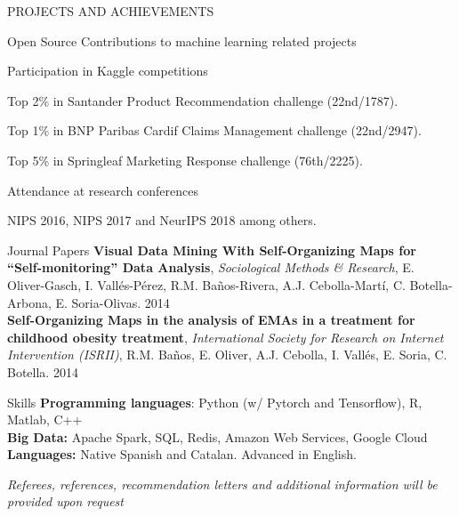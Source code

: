 \documentclass{resume} %
\begin{document}
\begin{rSection}{PROJECTS AND ACHIEVEMENTS}
\begin{rSubsection}{Open Source Contributions to machine learning related projects}
\end{rSubsection}

\vspace{-6pt}

\begin{rSubsection}{Participation in Kaggle competitions}
{}{}{}  

\vspace{-3pt}

\item Top 2\% in Santander Product Recommendation challenge (22nd/1787).
\item Top 1\% in BNP Paribas Cardif Claims Management challenge (22nd/2947).
\item Top 5\% in Springleaf Marketing Response challenge (76th/2225).

\end{rSubsection}

\vspace{-6pt}

\begin{rSubsection}{Attendance at research conferences}{}{}{}  

\vspace{-3pt}

 \item NIPS 2016, NIPS 2017 and NeurIPS 2018 among others.

\end{rSubsection}

\end{rSection} 



\begin{rSection}{Journal Papers}
{\textbf{Visual Data Mining With Self-Organizing Maps for ``Self-monitoring'' Data Analysis}, \textit{Sociological Methods \& Research}, E. Oliver-Gasch, I. Vallés-Pérez, R.M. Baños-Rivera, A.J. Cebolla-Martí, C. Botella-Arbona, E. Soria-Olivas. \hfill {2014}}\\
{\textbf{Self-Organizing Maps in the analysis of EMAs in a treatment for childhood obesity treatment}, \textit{International Society for Research on Internet Intervention (ISRII)}, R.M. Baños, E. Oliver, A.J. Cebolla, I. Vallés, E. Soria, C. Botella.  \hfill {2014}}

\end{rSection}




\begin{rSection}{Skills} \itemsep -3pt  
{\textbf{Programming languages}: Python (w/ Pytorch and Tensorflow), R, Matlab, C++ }  \\
{\textbf{Big Data:} Apache Spark, SQL, Redis, Amazon Web Services, Google Cloud } \\
{\textbf{Languages:} Native Spanish and Catalan. Advanced in English.}
\end{rSection}  
 
\vspace{\fill}

\begin{flushright}
	\small{\textit{Referees, references, recommendation letters and additional information will be provided upon request}}
\end{flushright}
\end{document}
